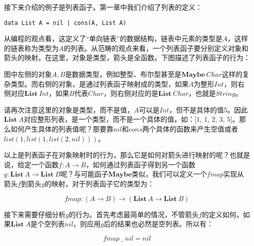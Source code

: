 \documentclass{article}
\begin{document}
\begin{example}
接下来介绍的例子是列表函子。第一章中我们介绍了列表的定义：

\lstset{frame=none}
\begin{lstlisting}
data List A = nil | cons(A, List A)
\end{lstlisting}

从编程的观点看，这定义了“单向链表”的数据结构，链表中元素的类型是$A$，这样的链表称为类型为$A$的列表。从范畴的观点来看，一个列表函子要分别定义对象和箭头的映射。在这里，对象是类型，箭头是全函数。下图描述了列表函子的行为：

\begin{center}
\end{center}

图中左侧的对象$A, B$是数据类型，例如整型、布尔型甚至是$\mathbf{Maybe}\ Char$这样的复杂类型。而右侧的对象，是通过列表函子映射成的类型，如果$A$为整形$Int$，则右侧对应$\mathbf{List}\ Int$，如果$B$代表$Char$，则右侧对应的是$\mathbf{List}\ Char$，也就是$String$。

请再次注意这里的对象是类型，而不是值，$A$可以是$Int$，但不是具体的值5。因此$\mathbf{List}\ A$对应整形列表，是一个类型，而不是一个具体的值，如：[1, 1, 2, 3, 5]。那么如何产生具体的列表值呢？那要靠$nil$和$cons$两个具体的函数来产生空值或者$list(1, list(1, list(2, nil)))$。

以上是列表函子在对象映射时的行为，那么它是如何对箭头进行映射的呢？也就是说，给定一个函数$f: A \to B$，如何通过列表函子得到另一个函数$g: \mathbf{List}\ A \to \mathbf{List}\ B$呢？与可能函子$\mathbf{Maybe}$类似，我们可以定义一个$fmap$实现从箭头$f$到箭头$g$的映射，对于列表函子它的类型为：

\[
fmap: (A \to B) \to (\mathbf{List}\ A \to \mathbf{List}\ B)
\]

接下来需要仔细分析$g$的行为。首先考虑最简单的情况，不管箭头$f$的定义如何，如果$\mathbf{List}\ A$是个空列表$nil$，则应用$g$后的结果也必然是空列表。所以有：

\[
fmap\ \_\ nil = nil
\]


\end{example}
\end{document}
